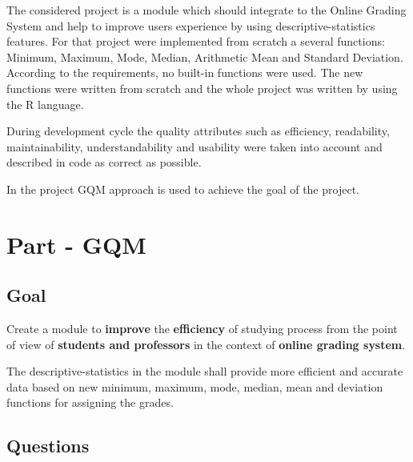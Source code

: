 \documentclass[12pt]{article}
\begin{document}
The considered project is a module which should integrate to the Online Grading System and help to improve users experience by using descriptive-statistics features. For that project were implemented from scratch a several functions: Minimum, Maximum, Mode, Median, Arithmetic Mean and Standard Deviation. According to the requirements, no built-in functions were used. The new functions were written from scratch and the whole project was written by using the R language.

During development cycle the quality attributes such as efficiency, readability,  maintainability, understandability and usability were taken into account and described in code as correct as possible.

In the project GQM approach is used to achieve the goal of the project.\cite{GQM-approach} \cite{GQM} \cite{GQM-wiki} \cite{GQM-eduardo} \cite{GQM-book} \cite{GQM-book2} \cite{GQM-Bjorn}

\section{Part - GQM}      
\subsection{Goal}
Create a module to \textbf{improve} the \textbf{efficiency} of studying process from the point of view of \textbf{students and professors} in the context of \textbf{online grading system}. \par 
The descriptive-statistics in the module shall provide more efficient and accurate data based on new minimum, maximum, mode, median, mean and deviation functions for assigning the grades.

\subsection{Questions}
\end{document}
